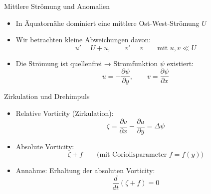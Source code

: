 

\begin{frame}{Mittlere Strömung und Anomalien}
	\begin{itemize}
		\item In Äquatornähe dominiert eine mittlere Ost-West-Strömung \( U \)
		\item Wir betrachten kleine Abweichungen davon:
		      \[
			      u' = U + u, \qquad v' = v \qquad \text{mit } u, v \ll U
		      \]
		\item Die Strömung ist quellenfrei → Stromfunktion \( \psi \) existiert:
		      \[
			      u = -\frac{\partial \psi}{\partial y}, \qquad v = \frac{\partial \psi}{\partial x}
		      \]
	\end{itemize}
\end{frame}

\begin{frame}{Zirkulation und Drehimpuls}
	\begin{itemize}
		\item Relative Vorticity (Zirkulation):
		      \[
			      \zeta = \frac{\partial v}{\partial x} - \frac{\partial u}{\partial y} = \Delta \psi
		      \]
		\item Absolute Vorticity:
		      \[
			      \zeta + f \qquad \text{(mit Coriolisparameter } f = f(y) \text{)}
		      \]
		\item Annahme: Erhaltung der absoluten Vorticity:
		      \[
			      \frac{d}{dt} (\zeta + f) = 0
		      \]
	\end{itemize}
\end{frame}

